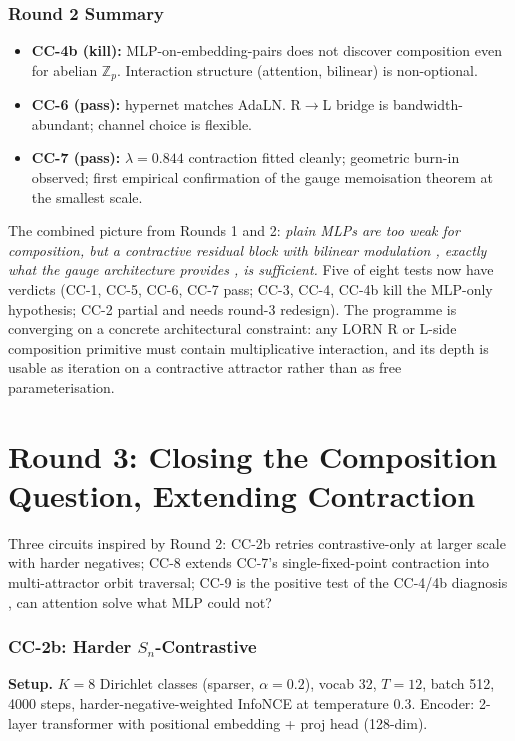 \documentclass[10pt, twocolumn, a4paper]{article}
\newcommand{\Sn}{S_n}
\begin{document}
\section{Round 2 Summary}

\begin{itemize}[nosep]
\item \textbf{CC-4b (kill):} MLP-on-embedding-pairs does not discover composition even for abelian $\mathbb{Z}_p$. Interaction structure (attention, bilinear) is non-optional.
\item \textbf{CC-6 (pass):} hypernet matches AdaLN. R$\to$L bridge is bandwidth-abundant; channel choice is flexible.
\item \textbf{CC-7 (pass):} $\lambda = 0.844$ contraction fitted cleanly; geometric burn-in observed; first empirical confirmation of the gauge memoisation theorem at the smallest scale.
\end{itemize}

The combined picture from Rounds 1 and 2: \emph{plain MLPs are too weak for composition, but a contractive residual block with bilinear modulation ,  exactly what the gauge architecture provides ,  is sufficient.} Five of eight tests now have verdicts (CC-1, CC-5, CC-6, CC-7 pass; CC-3, CC-4, CC-4b kill the MLP-only hypothesis; CC-2 partial and needs round-3 redesign). The programme is converging on a concrete architectural constraint: any LORN R or L-side composition primitive must contain multiplicative interaction, and its depth is usable as iteration on a contractive attractor rather than as free parameterisation.


\part*{Round 3: Closing the Composition Question, Extending Contraction}

Three circuits inspired by Round 2: CC-2b retries contrastive-only at larger scale with harder negatives; CC-8 extends CC-7's single-fixed-point contraction into multi-attractor orbit traversal; CC-9 is the positive test of the CC-4/4b diagnosis ,  can attention solve what MLP could not?

\section{CC-2b: Harder $\Sn$-Contrastive}

\textbf{Setup.} $K=8$ Dirichlet classes (sparser, $\alpha = 0.2$), vocab 32, $T=12$, batch 512, 4000 steps, harder-negative-weighted InfoNCE at temperature 0.3. Encoder: 2-layer transformer with positional embedding + proj head (128-dim).
\end{document}
